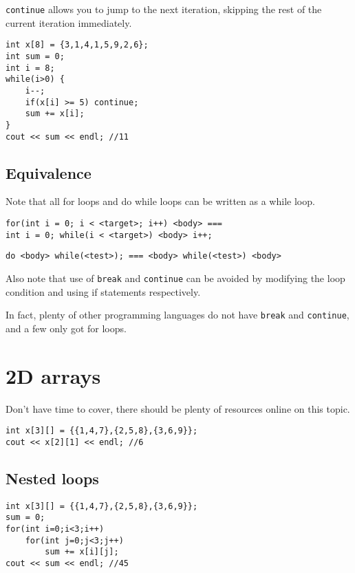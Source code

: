 \texttt{continue} allows you to jump to the next iteration, skipping the rest of the current iteration immediately.

\begin{lstlisting}
int x[8] = {3,1,4,1,5,9,2,6};
int sum = 0;
int i = 8;
while(i>0) {
    i--;
    if(x[i] >= 5) continue;
    sum += x[i];
}
cout << sum << endl; //11
\end{lstlisting}

\subsection{Equivalence}

Note that all for loops and do while loops can be written as a while loop.

\begin{lstlisting}[basicstyle=rmfamily]
for(int i = 0; i < <target>; i++) <body> === 
int i = 0; while(i < <target>) <body> i++;
\end{lstlisting}

\begin{lstlisting}[basicstyle=rmfamily]
do <body> while(<test>); === <body> while(<test>) <body>
\end{lstlisting}

Also note that use of \texttt{break} and \texttt{continue} can be avoided by modifying the loop condition and using if statements respectively. 

In fact, plenty of other programming languages do not have \texttt{break} and \texttt{continue}, and a few only got for loops. 

\section{2D arrays}

Don't have time to cover, there should be plenty of resources online on this topic.

\begin{lstlisting}
int x[3][] = {{1,4,7},{2,5,8},{3,6,9}};
cout << x[2][1] << endl; //6
\end{lstlisting}

\subsection{Nested loops}

\begin{lstlisting}
int x[3][] = {{1,4,7},{2,5,8},{3,6,9}};
sum = 0;
for(int i=0;i<3;i++)
    for(int j=0;j<3;j++)
        sum += x[i][j];
cout << sum << endl; //45
\end{lstlisting}

